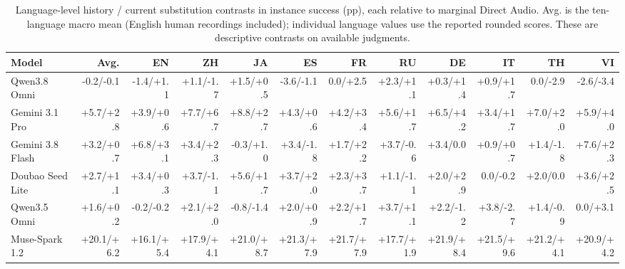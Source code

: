 \begin{table}[htbp]
\centering
\caption{Language-level history / current substitution contrasts in instance success (pp), each relative to marginal Direct Audio. Avg. is the ten-language macro mean (English human recordings included); individual language values use the reported rounded scores. These are descriptive contrasts on available judgments.}
\label{tab:factorial_languages}
\begingroup
\fontsize{6.6}{8.2}\selectfont
\setlength{\tabcolsep}{1pt}
\renewcommand{\arraystretch}{1.06}
\begin{tabular*}{\linewidth}{@{}l@{\extracolsep{\fill}}*{11}{r}@{}}
\toprule
\textbf{Model} & \textbf{Avg.} & \textbf{EN} & \textbf{ZH} & \textbf{JA} & \textbf{ES} & \textbf{FR} & \textbf{RU} & \textbf{DE} & \textbf{IT} & \textbf{TH} & \textbf{VI} \\
\midrule
Qwen3.8 Omni & -0.2/-0.1 & -1.4/+1.1 & +1.1/-1.7 & +1.5/+0.5 & -3.6/-1.1 & 0.0/+2.5 & +2.3/+1.1 & +0.3/+1.4 & +0.9/+1.7 & 0.0/-2.9 & -2.6/-3.4 \\
Gemini 3.1 Pro & +5.7/+2.8 & +3.9/+0.6 & +7.7/+6.7 & +8.8/+2.7 & +4.3/+0.6 & +4.2/+3.4 & +5.6/+1.7 & +6.5/+4.2 & +3.4/+1.7 & +7.0/+2.0 & +5.9/+4.0 \\
Gemini 3.8 Flash & +3.2/+0.7 & +6.8/+3.1 & +3.4/+2.3 & -0.3/+1.0 & +3.4/-1.8 & +1.7/+2.2 & +3.7/-0.6 & +3.4/0.0 & +0.9/+0.7 & +1.4/-1.8 & +7.6/+2.3 \\
Doubao Seed Lite & +2.7/+1.1 & +3.4/+0.3 & +3.7/-1.1 & +5.6/+1.7 & +3.7/+2.0 & +2.3/+3.7 & +1.1/-1.1 & +2.0/+2.9 & 0.0/-0.2 & +2.0/0.0 & +3.6/+2.5 \\
Qwen3.5 Omni & +1.6/+0.2 & -0.2/-0.2 & +2.1/+2.0 & -0.8/-1.4 & +2.0/+0.9 & +2.2/+1.7 & +3.7/+1.1 & +2.2/-1.2 & +3.8/-2.7 & +1.4/-0.9 & 0.0/+3.1 \\
Muse-Spark 1.2 & +20.1/+6.2 & +16.1/+5.4 & +17.9/+4.1 & +21.0/+8.7 & +21.3/+7.9 & +21.7/+7.9 & +17.7/+1.9 & +21.9/+8.4 & +21.5/+9.6 & +21.2/+4.1 & +20.9/+4.2 \\
\bottomrule
\end{tabular*}
\endgroup
\end{table}

